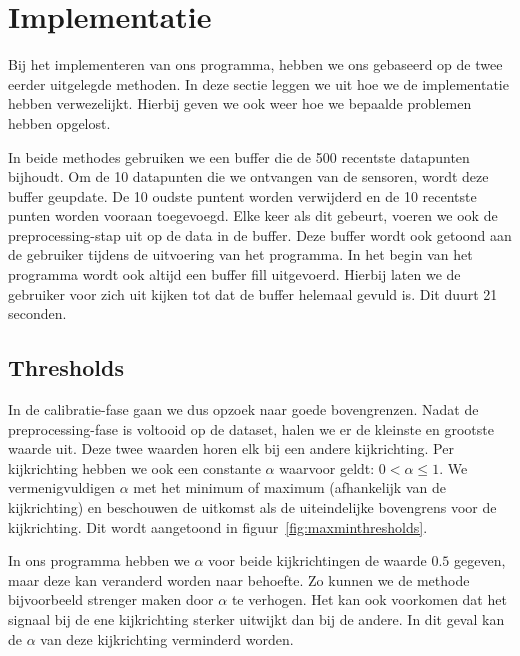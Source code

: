 \documentclass{article}
\begin{document}
\section{Implementatie}

Bij het implementeren van ons programma, hebben we ons gebaseerd op de twee eerder uitgelegde methoden. In deze sectie leggen we uit hoe we de implementatie hebben verwezelijkt. Hierbij geven we ook weer hoe we bepaalde problemen hebben opgelost.

In beide methodes gebruiken we een buffer die de 500 recentste datapunten bijhoudt. Om de 10 datapunten die we ontvangen van de sensoren, wordt deze buffer geupdate. De 10 oudste puntent worden verwijderd en de 10 recentste punten worden vooraan toegevoegd. Elke keer als dit gebeurt, voeren we ook de preprocessing-stap uit op de data in de buffer. Deze buffer wordt ook getoond aan de gebruiker tijdens de uitvoering van het programma. In het begin van het programma wordt ook altijd een buffer fill uitgevoerd. Hierbij laten we de gebruiker voor zich uit kijken tot dat de buffer helemaal gevuld is. Dit duurt 21 seconden.

\subsection{Thresholds}

In de calibratie-fase gaan we dus opzoek naar goede bovengrenzen. Nadat de preprocessing-fase is voltooid op de dataset, halen we er de kleinste en grootste waarde uit. Deze twee waarden horen elk bij een andere kijkrichting. Per kijkrichting hebben we ook een constante $\alpha$ waarvoor geldt: $0 < \alpha \leq 1$. We vermenigvuldigen $\alpha$ met het minimum of maximum (afhankelijk van de kijkrichting) en beschouwen de uitkomst als de uiteindelijke bovengrens voor de kijkrichting. Dit wordt aangetoond in figuur~\ref{fig:maxminthresholds}.

In ons programma hebben we $\alpha$ voor beide kijkrichtingen de waarde $0.5$ gegeven, maar deze kan veranderd worden naar behoefte. Zo kunnen we de methode bijvoorbeeld strenger maken door $\alpha$ te verhogen. Het kan ook voorkomen dat het signaal bij de ene kijkrichting sterker uitwijkt dan bij de andere. In dit geval kan de $\alpha$ van deze kijkrichting verminderd worden.
\end{document}
